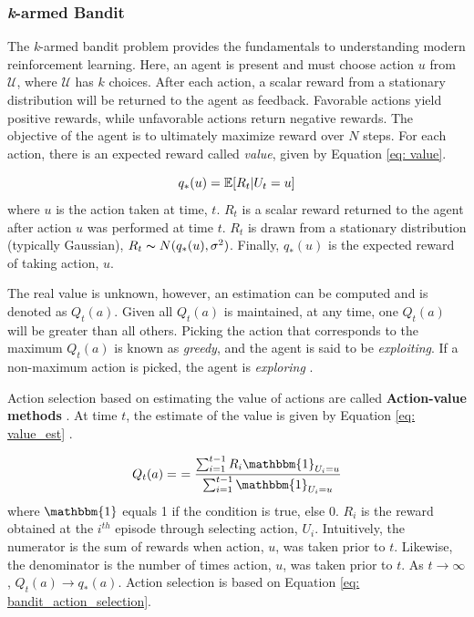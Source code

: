 \subsubsection{\textit{k}-armed Bandit}

The \textit{k}-armed bandit problem provides the fundamentals to understanding modern reinforcement learning.  Here, an agent is present and must choose action $u$ from $\mathcal{U}$, where $\mathcal{U}$ has $k$ choices.  After each action, a scalar reward from a stationary distribution will be returned to the agent as feedback. Favorable actions yield positive rewards, while unfavorable actions return negative rewards. The objective of the agent is to ultimately maximize reward over $N$ steps.  For each action, there is an expected reward called \textit{value}, given by Equation \ref{eq: value}.

\begin{equation}
    \centering
    q_*(u) = \mathbb{E}[R_t | U_t = u]
    \label{eq: value}
\end{equation}
where $u$ is the action taken at time, $t$.  $R_t$ is a scalar reward returned to the agent after action $u$ was performed at time $t$. $R_t$ is drawn from a stationary distribution (typically Gaussian), $R_t \thicksim N(q_*(u), \sigma^2)$. Finally, $q_*(u)$ is the expected reward of taking action, $u$.

The real value is unknown, however, an estimation can be computed and is denoted as $Q_t(a)$.  Given all $Q_t(a)$ is maintained, at any time, one $Q_t(a)$ will be greater than all others.  Picking the action that corresponds to the maximum $Q_t(a)$ is known as \textit{greedy}, and the agent is said to be \textit{exploiting}.  If a non-maximum action is picked, the agent is \textit{exploring} \cite{sutton}.

Action selection based on estimating the value of actions are called \textbf{Action-value methods} \cite{action_value_method}.  At time $t$, the estimate of the value is given by Equation \ref{eq: value_est} \cite{sutton}.

\begin{equation}
    \centering
    Q_t(a) = \
    = \frac{\sum_{i=1}^{t - 1} R_i \mathbbm{1}_{U_i=u}}
    {\sum_{i = 1}^{t - 1} \mathbbm{1}_{U_i = u}}
    \label{eq: value_est}
\end{equation}
where $\mathbbm{1}$ equals 1 if the condition is true, else 0.  $R_i$ is the reward obtained at the $i^{th}$ episode through selecting action, $U_i$.  Intuitively, the numerator is the sum of rewards when action, $u$, was taken prior to $t$.  Likewise, the denominator is the number of times action, $u$, was taken prior to $t$. As $t \rightarrow \infty$, $Q_t(a) \rightarrow q_*(a)$.  Action selection is based on Equation \ref{eq: bandit_action_selection}.

